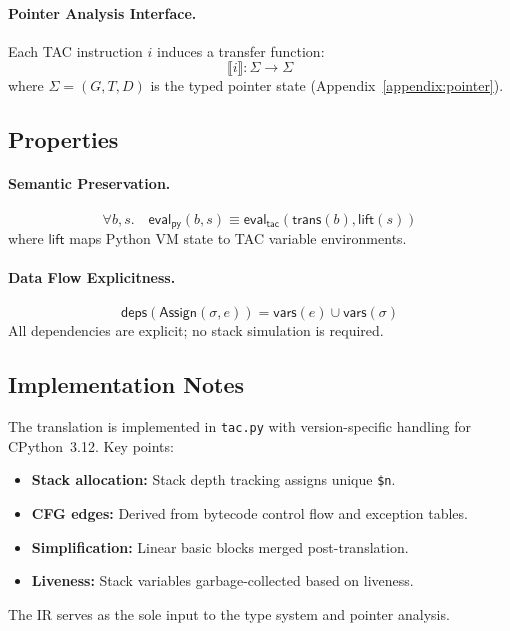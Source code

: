 \paragraph{Pointer Analysis Interface.}
Each TAC instruction $i$ induces a transfer function:
\[
\llbracket i \rrbracket : \Sigma \to \Sigma
\]
where $\Sigma = (G, T, D)$ is the typed pointer state (Appendix~\ref{appendix:pointer}).

\subsection{Properties}

\paragraph{Semantic Preservation.}
\[
\forall b, s. \quad
\mathsf{eval}_{\mathsf{py}}(b, s) \equiv
\mathsf{eval}_{\mathsf{tac}}(\mathsf{trans}(b), \mathsf{lift}(s))
\]
where $\mathsf{lift}$ maps Python VM state to TAC variable environments.

\paragraph{Data Flow Explicitness.}
\[
\mathsf{deps}(\mathsf{Assign}(\sigma, e)) =
\mathsf{vars}(e) \cup \mathsf{vars}(\sigma)
\]
All dependencies are explicit; no stack simulation is required.

\subsection{Implementation Notes}

The translation is implemented in \texttt{tac.py} with version-specific handling for CPython~3.12. Key points:
\begin{itemize}
\item \textbf{Stack allocation:} Stack depth tracking assigns unique \texttt{\$n}.
\item \textbf{CFG edges:} Derived from bytecode control flow and exception tables.
\item \textbf{Simplification:} Linear basic blocks merged post-translation.
\item \textbf{Liveness:} Stack variables garbage-collected based on liveness.
\end{itemize}
The IR serves as the sole input to the type system and pointer analysis.
